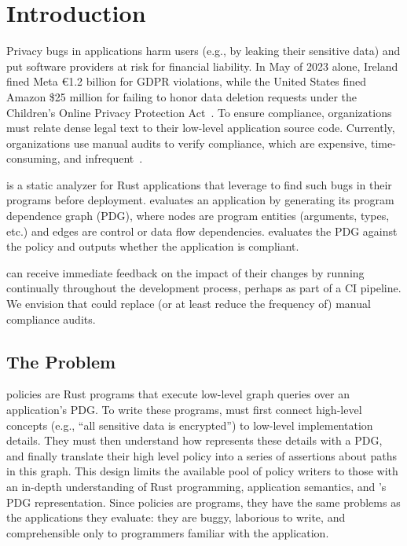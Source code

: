 \chapter{Introduction}
\label{sec:intro}

Privacy bugs in applications harm users (e.g., by leaking their sensitive data) and put software providers 
at risk for financial liability.
%
In May of 2023 alone, Ireland fined Meta €1.2 billion for GDPR violations, 
while the United States fined Amazon \$25 million for failing to honor data deletion requests 
under the Children’s Online Privacy Protection Act~\cite{meta-fine,amazon-fine}.
%
To ensure compliance, organizations must relate dense legal text to their low-level application source code.
%
Currently, organizations use manual audits to verify compliance, which are expensive, time-consuming,
and infrequent~\cite{CostContinuousCompliance2020,smithGDPRRacketWho}.
%

\sys{} is a static analyzer for Rust applications that \devs{} leverage to find such bugs in their programs before deployment.
%
\sys{} evaluates an application by generating its program dependence graph (PDG), 
where nodes are program entities (arguments, types, etc.) and edges are control or data flow dependencies.
%
\sys{} evaluates the PDG against the policy and outputs whether the application is compliant.

\Devs{} can receive immediate feedback on the impact of their changes by running 
\sys{} continually throughout the development process, perhaps as part of a CI pipeline.
%
We envision that \sys{} could replace (or at least reduce the frequency of) manual compliance audits.


\section{The Problem}
\sys{} policies are Rust programs that execute low-level graph queries over an application's PDG.
%
To write these programs, \devs{} must first connect high-level concepts 
(e.g., ``all sensitive data is encrypted'')
to low-level implementation details.
%
They must then understand how \sys{} represents these details with a PDG,
and finally translate their high level policy into a series of assertions about paths in this graph.
%
This design limits the available pool of policy writers to those with 
an in-depth understanding of Rust programming, application semantics, and \sys{}'s PDG representation.
%
Since policies are programs, they have the same problems as the applications they evaluate: 
they are buggy, laborious to write, and comprehensible only to programmers familiar with the application.

